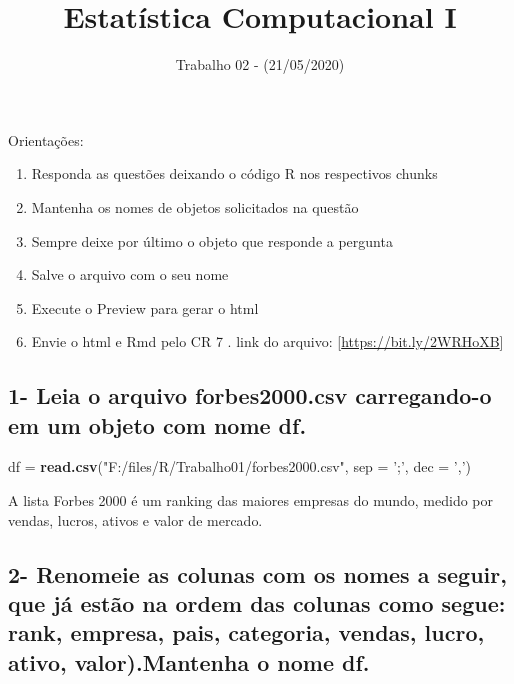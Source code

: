\documentclass[
]{article}
\title{Estatística Computacional I}
\subtitle{Trabalho 02 - (21/05/2020)}
\author{}
\date{\vspace{-2.5em}}
\newenvironment{Shaded}{\begin{snugshade}}{\end{snugshade}}
\newcommand{\DataTypeTok}[1]{\textcolor[rgb]{0.13,0.29,0.53}{#1}}
\newcommand{\KeywordTok}[1]{\textcolor[rgb]{0.13,0.29,0.53}{\textbf{#1}}}
\newcommand{\NormalTok}[1]{#1}
\newcommand{\StringTok}[1]{\textcolor[rgb]{0.31,0.60,0.02}{#1}}
\providecommand{\tightlist}{%
  \setlength{\itemsep}{0pt}\setlength{\parskip}{0pt}}
\begin{document}
\maketitle

Orientações:

\begin{enumerate}
\def\labelenumi{\arabic{enumi}.}
\tightlist
\item
  Responda as questões deixando o código R nos respectivos chunks
\item
  Mantenha os nomes de objetos solicitados na questão
\item
  Sempre deixe por último o objeto que responde a pergunta
\item
  Salve o arquivo com o seu nome
\item
  Execute o Preview para gerar o html
\item
  Envie o html e Rmd pelo CR 7 . link do arquivo:
  {[}\url{https://bit.ly/2WRHoXB}{]}
\end{enumerate}

\hypertarget{leia-o-arquivo-forbes2000.csv-carregando-o-em-um-objeto-com-nome-df.}{%
\subsection{1- Leia o arquivo forbes2000.csv carregando-o em um objeto
com nome
df.}\label{leia-o-arquivo-forbes2000.csv-carregando-o-em-um-objeto-com-nome-df.}}

\begin{Shaded}
\begin{Highlighting}[]
\NormalTok{df =}\StringTok{ }\KeywordTok{read.csv}\NormalTok{(}\StringTok{"F:/files/R/Trabalho01/forbes2000.csv"}\NormalTok{, }\DataTypeTok{sep =} \StringTok{';'}\NormalTok{, }\DataTypeTok{dec =} \StringTok{','}\NormalTok{)}
\end{Highlighting}
\end{Shaded}

A lista Forbes 2000 é um ranking das maiores empresas do mundo, medido
por vendas, lucros, ativos e valor de mercado.

\hypertarget{renomeie-as-colunas-com-os-nomes-a-seguir-que-juxe1-estuxe3o-na-ordem-das-colunas-como-segue-rank-empresa-pais-categoria-vendas-lucro-ativo-valor.mantenha-o-nome-df.}{%
\subsection{2- Renomeie as colunas com os nomes a seguir, que já estão
na ordem das colunas como segue: rank, empresa, pais, categoria, vendas,
lucro, ativo, valor).Mantenha o nome
df.}\label{renomeie-as-colunas-com-os-nomes-a-seguir-que-juxe1-estuxe3o-na-ordem-das-colunas-como-segue-rank-empresa-pais-categoria-vendas-lucro-ativo-valor.mantenha-o-nome-df.}}
\end{document}
